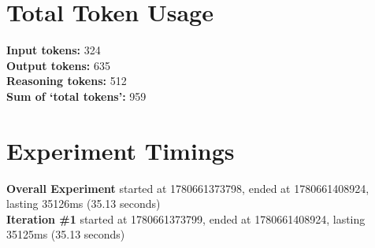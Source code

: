 \documentclass{article}
\begin{document}
\section*{Total Token Usage}
\textbf{Input tokens: }324
\\\textbf{Output tokens: }635
\\\textbf{Reasoning tokens: }512
\\\textbf{Sum of `total tokens': }959
\section*{Experiment Timings}
\textbf{Overall Experiment} started at 1780661373798, ended at 1780661408924, lasting 35126ms (35.13 seconds)
\\\textbf{Iteration \#1} started at 1780661373799, ended at 1780661408924, lasting 35125ms (35.13 seconds)
\end{document}

